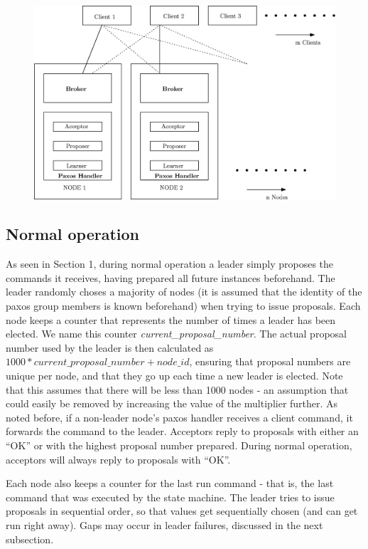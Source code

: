\documentclass[letterpaper]{article}
\begin{document}
\begin{figure}[h!]
\centering
\includegraphics[width = 4.5in, keepaspectratio]{Architecture.eps}\\
\end{figure}
\subsection{Normal operation}
As seen in Section 1, during normal operation a leader simply proposes the
commands it receives, having prepared all future instances beforehand. The
leader randomly choses a majority of nodes (it is assumed that the identity of
the paxos group members is known beforehand) when trying to issue proposals.
Each node keeps a counter that represents the number of times a leader has been
elected.
We name this counter \emph{current\_proposal\_number}. 
The actual proposal number used by the leader is then calculated as $1000 * current\_proposal\_number + node\_id$, 
ensuring that proposal numbers are unique per node, and that they go
up each time a new leader is elected. Note that this assumes that there will be
less than 1000 nodes - an assumption that could easily be removed by increasing
the value of the multiplier further. As noted before, if a non-leader node's
paxos handler receives a client command, it forwards the command to the leader.
Acceptors reply to proposals with either an ``OK'' or with the highest proposal
number prepared. During normal operation, acceptors will always reply to
proposals with ``OK''.

Each node also keeps a counter for the last run command - that is, the last
command that was executed by the state machine. The leader tries to issue
proposals in sequential order, so that values get sequentially chosen (and can
get run right away). Gaps may occur in leader failures, discussed in the next
subsection.
\end{document}
